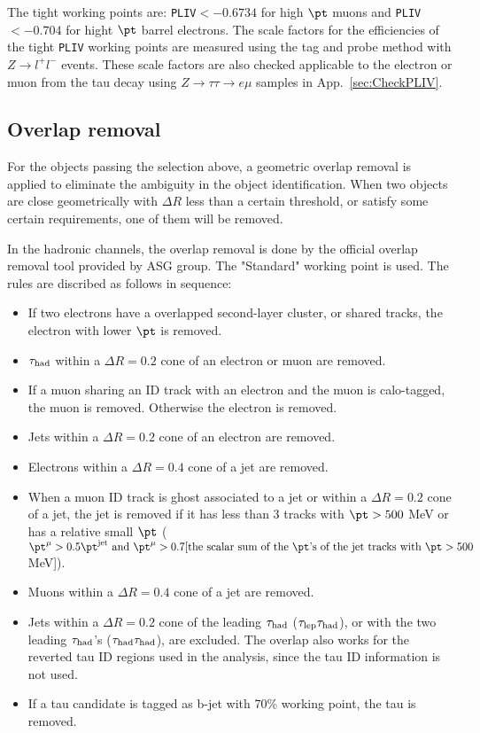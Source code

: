 The tight working points are: \texttt{PLIV}$<-0.6734$ for high $\pt$ muons and \texttt{PLIV}$<-0.704$ for hight $\pt$ barrel electrons. The scale factors for the efficiencies of the tight \texttt{PLIV} working points are measured using the tag and probe method with $Z\rightarrow l^+l^-$ events. These scale
factors are also checked applicable to the electron or muon from the tau decay using $Z\rightarrow\tau\tau\rightarrow e\mu$ samples in App.~\ref{sec:CheckPLIV}. 

\subsection{Overlap removal}
For the objects passing the selection above, a geometric overlap removal is applied to eliminate the ambiguity in the object identification.  When two objects are close geometrically with $\Delta R$ less than a certain threshold, or satisfy some certain requirements, one of them will be removed. 

In the hadronic channels, the overlap removal is done by the official overlap removal tool provided by ASG group. The "Standard" working point is used. The rules are discribed as follows in sequence:

\begin{itemize}
\item If two electrons have a overlapped second-layer cluster, or shared tracks, the electron with lower $\pt$ is removed.
\item $\tau_\text{had}$ within a $\Delta R=0.2$ cone of an electron or muon are removed.
\item If a muon sharing an ID track with an electron and the muon is calo-tagged, the muon is removed. Otherwise the electron is removed.
\item Jets within a $\Delta R=0.2$ cone of an electron are removed.
\item Electrons within a $\Delta R=0.4$ cone of a jet are removed.
\item When a muon ID track is ghost associated to a jet or within a $\Delta R=0.2$ cone of a jet, the jet is removed if it has less than 3 tracks with $\pt>500$ MeV or has a relative small $\pt$ ($\pt^{\mu}>0.5\pt^{\text{jet}} \text{ and } \pt^{\mu}>0.7[\text{the scalar sum of the } \pt \text{'s of the jet tracks with } \pt>500$ MeV]).
\item Muons within a $\Delta R=0.4$ cone of a jet are removed.
\item Jets within a $\Delta R=0.2$ cone of the leading $\tau_\text{had}$ ($\tau_\text{lep}{}\tau_\text{had}$), or with the two leading $\tau_\text{had}$'s ($\tau_\text{had}{}\tau_\text{had}$), are excluded. The overlap also works for the reverted tau ID regions used in the analysis, since the tau ID information is not used.
\item If a tau candidate is tagged as b-jet with 70\% working point, the tau is removed.
\end{itemize}

